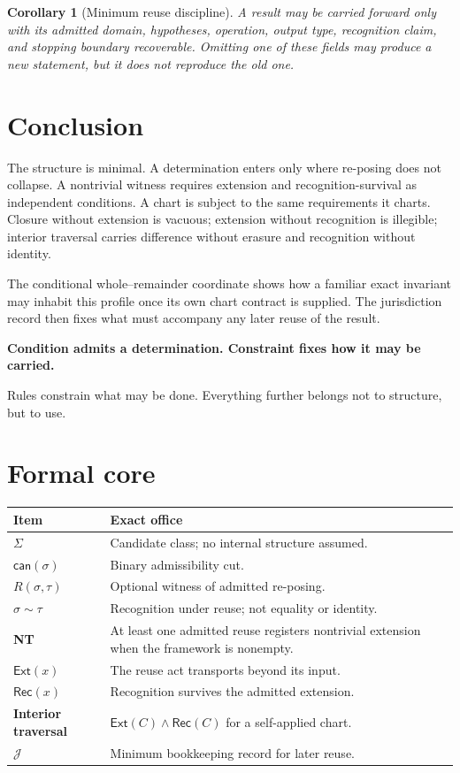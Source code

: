 \documentclass[11pt,letterpaper]{article}
\theoremstyle{constraintstyle}
\newtheorem{corollary}[theorem]{Corollary}
\newcommand{\Can}{\mathsf{can}}
\newcommand{\Ext}{\mathsf{Ext}}
\newcommand{\Rec}{\mathsf{Rec}}
\begin{document}
\begin{corollary}[Minimum reuse discipline]
A result may be carried forward only with its admitted domain, hypotheses, operation, output type, recognition claim, and stopping boundary recoverable.  Omitting one of these fields may produce a new statement, but it does not reproduce the old one.
\end{corollary}

\section{Conclusion}

The structure is minimal.  A determination enters only where re-posing does not collapse.  A nontrivial witness requires extension and recognition-survival as independent conditions.  A chart is subject to the same requirements it charts.  Closure without extension is vacuous; extension without recognition is illegible; interior traversal carries difference without erasure and recognition without identity.

The conditional whole--remainder coordinate shows how a familiar exact invariant may inhabit this profile once its own chart contract is supplied.  The jurisdiction record then fixes what must accompany any later reuse of the result.

\begin{resultbox}
\centering
\textbf{Condition admits a determination. Constraint fixes how it may be carried.}
\end{resultbox}

Rules constrain what may be done.  Everything further belongs not to structure, but to use.

\appendix

\section{Formal core}

\begin{center}
\begin{tabularx}{\textwidth}{>{\bfseries}l X}
\toprule
Item & Exact office \\
\midrule
$\Sigma$ & Candidate class; no internal structure assumed. \\
$\Can(\sigma)$ & Binary admissibility cut. \\
$R(\sigma,\tau)$ & Optional witness of admitted re-posing. \\
$\sigma\sim\tau$ & Recognition under reuse; not equality or identity. \\
NT & At least one admitted reuse registers nontrivial extension when the framework is nonempty. \\
$\Ext(x)$ & The reuse act transports beyond its input. \\
$\Rec(x)$ & Recognition survives the admitted extension. \\
Interior traversal & $\Ext(C)\wedge\Rec(C)$ for a self-applied chart. \\
$\mathcal J$ & Minimum bookkeeping record for later reuse. \\
\bottomrule
\end{tabularx}
\end{center}
\end{document}
